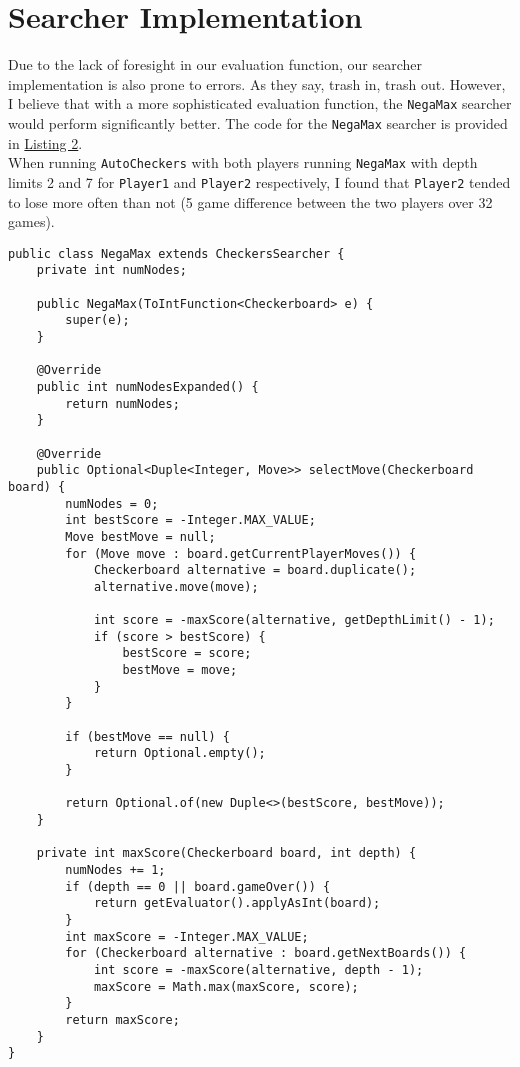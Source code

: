 \documentclass[12pt]{article}
\begin{document}
\newpage

\section{Searcher Implementation}

Due to the lack of foresight in our evaluation function, our searcher implementation is also prone to errors. As they say, trash in, trash out. However, I believe that with a more sophisticated evaluation function, the \texttt{NegaMax} searcher would perform significantly better. The code for the \texttt{NegaMax} searcher is provided in \hyperref[list:negamax]{Listing 2}. \\

When running \texttt{AutoCheckers} with both players running \texttt{NegaMax} with depth limits 2 and 7 for \texttt{Player1} and \texttt{Player2} respectively, I found that \texttt{Player2} tended to lose more often than not (5 game difference between the two players over 32 games). \\

\label{list:negamax}
\begin{verbatim}
public class NegaMax extends CheckersSearcher {
    private int numNodes;

    public NegaMax(ToIntFunction<Checkerboard> e) {
        super(e);
    }

    @Override
    public int numNodesExpanded() {
        return numNodes;
    }

    @Override
    public Optional<Duple<Integer, Move>> selectMove(Checkerboard board) {
        numNodes = 0;
        int bestScore = -Integer.MAX_VALUE;
        Move bestMove = null;
        for (Move move : board.getCurrentPlayerMoves()) {
            Checkerboard alternative = board.duplicate();
            alternative.move(move);

            int score = -maxScore(alternative, getDepthLimit() - 1);
            if (score > bestScore) {
                bestScore = score;
                bestMove = move;
            }
        }

        if (bestMove == null) {
            return Optional.empty();
        }

        return Optional.of(new Duple<>(bestScore, bestMove));
    }

    private int maxScore(Checkerboard board, int depth) {
        numNodes += 1;
        if (depth == 0 || board.gameOver()) {
            return getEvaluator().applyAsInt(board);
        }
        int maxScore = -Integer.MAX_VALUE;
        for (Checkerboard alternative : board.getNextBoards()) {
            int score = -maxScore(alternative, depth - 1);
            maxScore = Math.max(maxScore, score);
        }
        return maxScore;
    }
}
\end{verbatim}
\vspace{2em}
\end{document}
